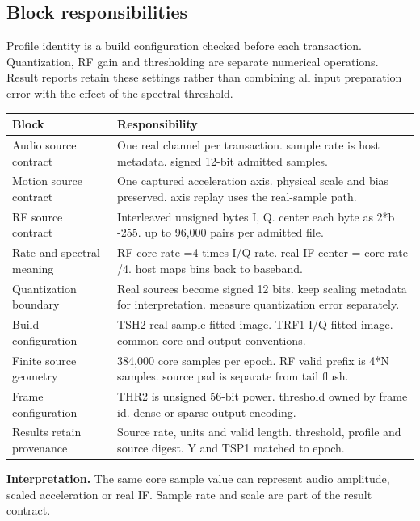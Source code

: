 \documentclass[11pt,letterpaper]{article}
\begin{document}
\subsection*{Block responsibilities}
Profile identity is a build configuration checked before each transaction. Quantization, RF gain and thresholding are separate numerical operations. Result reports retain these settings rather than combining all input preparation error with the effect of the spectral threshold.
\par\medskip\noindent
\begin{tabularx}{\linewidth}{@{}>{\raggedright\arraybackslash}p{1.65in}Y@{}}\toprule
\textbf{Block} & \textbf{Responsibility} \\ \midrule
Audio source contract & One real channel per transaction. sample rate is host metadata. signed 12-bit admitted samples. \\[5pt]
Motion source contract & One captured acceleration axis. physical scale and bias preserved. axis replay uses the real-sample path. \\[5pt]
RF source contract & Interleaved unsigned bytes I, Q. center each byte as 2*b -255. up to 96,000 pairs per admitted file. \\[5pt]
Rate and spectral meaning & RF core rate =4 times I/Q rate. real-IF center = core rate /4. host maps bins back to baseband. \\[5pt]
Quantization boundary & Real sources become signed 12 bits. keep scaling metadata for interpretation. measure quantization error separately. \\[5pt]
Build configuration & TSH2 real-sample fitted image. TRF1 I/Q fitted image. common core and output conventions. \\[5pt]
Finite source geometry & 384,000 core samples per epoch. RF valid prefix is 4*N samples. source pad is separate from tail flush. \\[5pt]
Frame configuration & THR2 is unsigned 56-bit power. threshold owned by frame id. dense or sparse output encoding. \\[5pt]
Results retain provenance & Source rate, units and valid length. threshold, profile and source digest. Y and TSP1 matched to epoch. \\[5pt]
\bottomrule\end{tabularx}
\vspace{8pt}
\noindent\textbf{Interpretation.} The same core sample value can represent audio amplitude, scaled acceleration or real IF. Sample rate and scale are part of the result contract.
\clearpage
\end{document}
